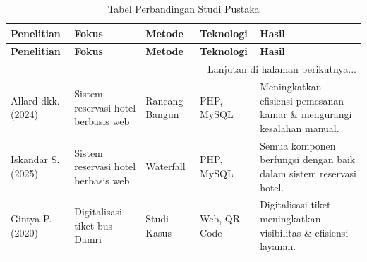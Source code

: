 \begin{longtable}{|p{1.75cm}|p{3cm}|p{2.25cm}|p{2.75cm}|p{4cm}|}
    \caption{Tabel Perbandingan Studi Pustaka}
    \label{tab:perbandingan_studi}
    \\
    \hline
    \textbf{Penelitian}                                            & \textbf{Fokus}                                       & \textbf{Metode}                                  & \textbf{Teknologi}                       & \textbf{Hasil}                                                              \\
    \hline
    \endfirsthead

    \hline
    \textbf{Penelitian}                                            & \textbf{Fokus}                                       & \textbf{Metode}                                  & \textbf{Teknologi}                       & \textbf{Hasil}                                                              \\
    \hline
    \endhead

    \hline
    \multicolumn{5}{r}{{Lanjutan di halaman berikutnya...}}                                                                                                                                                                                                                                           \\
    \endfoot

    \endlastfoot

    Allard dkk. (2024) \cite{Allard_Voutama_2024}                  & Sistem reservasi hotel berbasis web                  & Rancang Bangun                                   & PHP, MySQL                               & Meningkatkan efisiensi pemesanan kamar \& mengurangi kesalahan manual.      \\
    \hline

    Iskandar S. (2025) \cite{Iskandar_Susilawati_Akramunnisa_2025} & Sistem reservasi hotel berbasis web                  & Waterfall                                        & PHP, MySQL                               & Semua komponen berfungsi dengan baik dalam sistem reservasi hotel.          \\
    \hline

    Gintya P. (2020) \cite{Wibowo2020}                             & Digitalisasi tiket bus Damri                         & Studi Kasus                                      & Web, QR Code                             & Digitalisasi tiket meningkatkan visibilitas \& efisiensi layanan.           \\
    \hline


\end{longtable}
